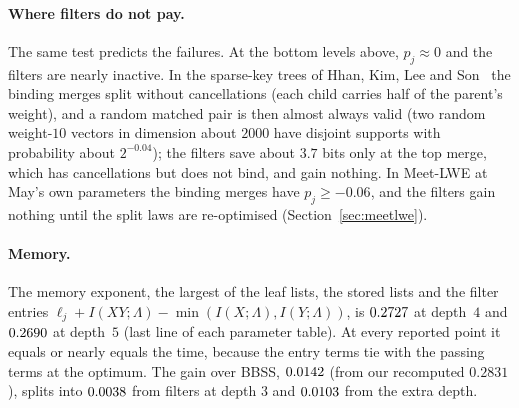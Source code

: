 \documentclass[11pt]{article}
\theoremstyle{definition}
\theoremstyle{remark}
\newif\ifincludemeetlwe \includemeetlwetrue  %
\begin{document}
\paragraph{Where filters do not pay.} The same test predicts the failures. At the bottom levels above, $p_j\approx0$
and the filters are nearly inactive. In the sparse-key trees of Hhan, Kim, Lee and Son~\cite{HKLS26} the binding
merges split without cancellations (each child carries half of the parent's weight), and a random matched pair is
then almost always valid (two random weight-$10$ vectors in dimension about $2000$ have disjoint supports with
probability about $2^{-0.04}$); the filters save about $3.7$ bits only at the top merge, which has cancellations but
does not bind, and gain nothing.\ifincludemeetlwe{} In Meet-LWE at May's own parameters the binding merges have $p_j\ge-0.06$, and the
filters gain nothing until the split laws are re-optimised (Section~\ref{sec:meetlwe}).\fi

\paragraph{Memory.} The memory exponent, the largest of the leaf lists, the stored lists and the filter entries
$\ell_j+I(XY;\Lambda)-\min(I(X;\Lambda),I(Y;\Lambda))$, is $0.2727$ at depth~$4$ and $0.2690$ at depth~$5$
(last line of each parameter table). At every reported point it equals or nearly equals the time, because the entry
terms tie with the passing terms at the optimum. The gain over BBSS,
$0.0142$ (from our recomputed $0.2831$), splits into $0.0038$ from filters at depth $3$ and $0.0103$ from the extra depth.

\begin{table}[ht]
\centering\small

\caption{The depth-4 optimum: levels (top) and merges (bottom). Columns:
$\delta_j(\cdot)$, the digit type of level $j$;
$\rho_j$, the representation exponent of a level-$(j-1)$ vector into level-$j$ pairs;
$c_j$, the constraint bits ($M_j=2^{c_jn}$);
$s_j$, the survival exponent of Section~\ref{sec:sound};
$\ell_j$, the list size;
\emph{pairs}, $P_j=2\ell_j-(c_{j-1}-c_j)$, the pairs an unfiltered merge would examine;
$p_j=H(\sigma_j)-2H_j$, the log-probability that a matched pair is a valid split;
$I(XY;\Lambda)$, the code rate (at $\pi=Q_\Lambda$);
\emph{entries gap}, $I(XY;\Lambda)-\min(I(X;\Lambda),I(Y;\Lambda))$, the log number of filters per vector;
\emph{saving}, $I(XY;\Lambda)-I(X;\Lambda)-I(Y;\Lambda)$ (negative means fewer pairs);
\emph{passing}, pairs $+$ saving, the pairs the filtered merge examines.
The last line gives the leaf build, the root condition and the memory exponent.
All exponents are per $n$.}
\label{tab:params4}
\end{table}
\end{document}
